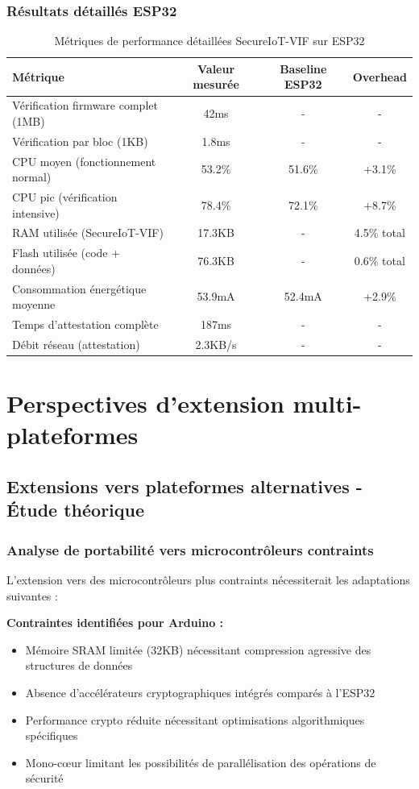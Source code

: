 \subsubsection{Résultats détaillés ESP32}

\begin{table}[h]
\centering
\caption{Métriques de performance détaillées SecureIoT-VIF sur ESP32}
\label{tab:esp32-performance-metrics}
\begin{tabular}{|l|c|c|c|}
\hline
\textbf{Métrique} & \textbf{Valeur mesurée} & \textbf{Baseline ESP32} & \textbf{Overhead} \\
\hline
Vérification firmware complet (1MB) & 42ms & - & - \\
Vérification par bloc (1KB) & 1.8ms & - & - \\
CPU moyen (fonctionnement normal) & 53.2\% & 51.6\% & +3.1\% \\
CPU pic (vérification intensive) & 78.4\% & 72.1\% & +8.7\% \\
RAM utilisée (SecureIoT-VIF) & 17.3KB & - & 4.5\% total \\
Flash utilisée (code + données) & 76.3KB & - & 0.6\% total \\
Consommation énergétique moyenne & 53.9mA & 52.4mA & +2.9\% \\
Temps d'attestation complète & 187ms & - & - \\
Débit réseau (attestation) & 2.3KB/s & - & - \\
\hline
\end{tabular}
\end{table}

\section{Perspectives d'extension multi-plateformes}

\subsection{Extensions vers plateformes alternatives - Étude théorique}

\subsubsection{Analyse de portabilité vers microcontrôleurs contraints}

L'extension vers des microcontrôleurs plus contraints nécessiterait les adaptations suivantes :

\textbf{Contraintes identifiées pour Arduino :}
\begin{itemize}
    \item Mémoire SRAM limitée (32KB) nécessitant compression agressive des structures de données
    \item Absence d'accélérateurs cryptographiques intégrés comparés à l'ESP32
    \item Performance crypto réduite nécessitant optimisations algorithmiques spécifiques
    \item Mono-cœur limitant les possibilités de parallélisation des opérations de sécurité
\end{itemize}

